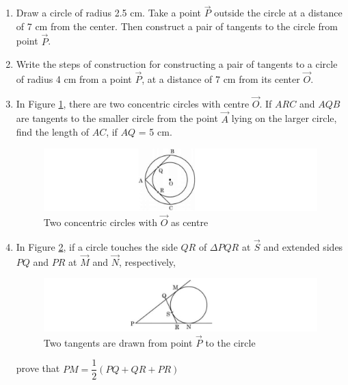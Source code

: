 \begin{enumerate}

	\item Draw a circle of radius 2.5 cm. Take a point $\vec{P}$ outside the circle at a distance of 7 cm from the center. Then construct a pair of tangents to the circle from point $\vec{P}$.

	\item Write the steps of construction for constructing a pair of tangents to a circle of radius 4 cm from a point $\vec{P}$, at a distance of 7 cm from its center $\vec{O}$.

	\item In Figure \ref{fig:tan1}, there are two concentric circles with centre $\vec{O}$. If $ARC$ and $AQB$ are tangents to the smaller circle  from the point $\vec{A}$ lying on the larger circle, find the length of $AC$, if $AQ$ = 5 cm.
		\begin{figure}[H]
			\centering
			\includegraphics[width=\columnwidth]{figs/tan}
			\caption{Two concentric circles with $\vec{O}$ as centre}
			\label{fig:tan1}
		\end{figure}
	
	\item In Figure \ref{fig:cir1}, if a circle touches the side $QR$ of $\Delta PQR$ at $\vec{S}$ and extended sides $PQ$ and $PR$ at $\vec{M}$ and $\vec{N}$, respectively,
		\begin{figure}[H]
			\centering
			\includegraphics[width=\columnwidth]{figs/cir}
				\caption{Two tangents are drawn from point $\vec{P}$ to the circle}
				\label{fig:cir1}
		\end{figure}
		prove that $PM=\dfrac{1}{2}(PQ+QR+PR)$


\end{enumerate}
